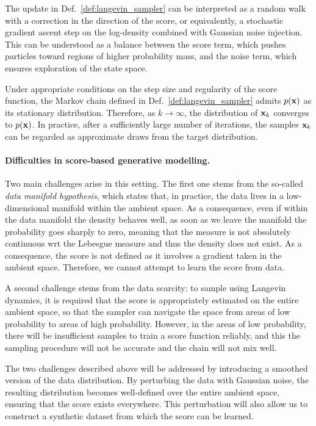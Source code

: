 The update in Def.~\ref{def:langevin_sampler} can be interpreted as a random walk with a correction in the direction of the score, or equivalently, a stochastic gradient ascent step on the log-density combined with Gaussian noise injection. This can be understood as a balance between the score term, which pushes particles toward regions of higher probability mass, and  the noise term, which ensures exploration of the state space.

\begin{remark}
Under appropriate conditions on the step size and regularity of the score function, the Markov chain defined in Def.~\ref{def:langevin_sampler} admits $p({ \mathbf{x}})$ as its stationary distribution. Therefore, as $k \to \infty$, the distribution of
${ \mathbf{x}}_k$ converges to $p({ \mathbf{x}})$. In practice, after a sufficiently large number of iterations, the samples ${ \mathbf{x}}_k$ can be regarded as approximate draws from the target distribution.
\end{remark}

\paragraph{Difficulties in score-based generative modelling.} Two main challenges arise in this setting. The first one stems from the so-called \emph{data manifold hypothesis}, which states that, in practice, the data lives in a low-dimensional manifold within the ambient space. As a consequence, even if within the data manifold the density behaves well, as soon as we leave the manifold the probability goes sharply to zero, meaning that the measure is not absolutely continuous wrt the Lebesgue measure and thus the density does not exist. As a consequence, the score is not defined as it involves a gradient taken in the ambient space. Therefore, we cannot attempt to learn the score from data.

A second challenge stems from the data scarcity: to sample using Langevin dynamics, it is required that the score is appropriately estimated on the entire ambient space, so that the sampler can navigate the space from areas of low probability to areas of high probability. However, in the areas of low probability, there will be insufficient samples to train a score function reliably, and this the sampling procedure will not be accurate and the chain will not mix well.  

\begin{remark}
The two challenges described above will be addressed by introducing a smoothed version of the data distribution. By perturbing the data with Gaussian noise, the resulting distribution becomes well-defined over the entire ambient space, ensuring that the score exists everywhere. This perturbation will also allow us to construct a synthetic dataset from which the score can be learned.
\end{remark}


